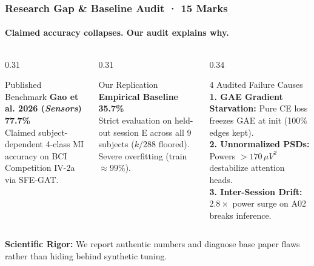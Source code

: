 \documentclass[aspectratio=169,10pt]{beamer}
\begin{document}
\begin{frame}
    \frametitle{Research Gap & Baseline Audit · 15 Marks}
    \framesubtitle{Claimed accuracy collapses. Our audit explains why.}
    \begin{columns}[T]
        \begin{column}{0.31\textwidth}
            \begin{block}{\small Published Benchmark}
                \scriptsize
                \textbf{Gao et al. 2026 (\textit{Sensors})}\\
                \Large \textbf{\color{ForestGreen}77.7\%}\\
                \scriptsize Claimed subject-dependent 4-class MI accuracy on BCI Competition IV-2a via SFE-GAT.
            \end{block}
        \end{column}
        \begin{column}{0.31\textwidth}
            \begin{block}{\small Our Replication}
                \scriptsize
                \textbf{Empirical Baseline}\\
                \Large \textbf{\color{AlertRed}35.7\%}\\
                \scriptsize Strict evaluation on held-out session E across all 9 subjects ($k/288$ floored). Severe overfitting (train $\approx 99\%$).
            \end{block}
        \end{column}
        \begin{column}{0.34\textwidth}
            \begin{block}{\small 4 Audited Failure Causes}
                \scriptsize
                \textbf{1. GAE Gradient Starvation:} Pure CE loss freezes GAE at init (100\% edges kept).\\
                \textbf{2. Unnormalized PSDs:} Powers $> 170\,\mu V^2$ destabilize attention heads.\\
                \textbf{3. Inter-Session Drift:} $2.8\times$ power surge on A02 breaks inference.
            \end{block}
        \end{column}
    \end{columns}
    \vspace{0.2cm}
    {\scriptsize \textbf{\color{ForestGreen}Scientific Rigor:} We report authentic numbers and diagnose base paper flaws rather than hiding behind synthetic tuning.}
\end{frame}
\end{document}

